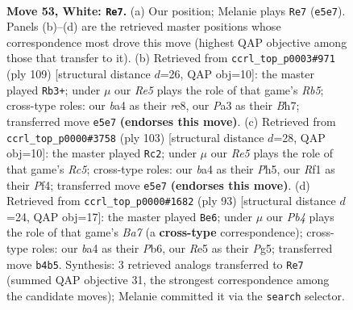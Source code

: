 \documentclass[11pt]{article}
\begin{document}
\clearpage

\begin{figure}[p]\centering
\begin{subfigure}{0.46\textwidth}\centering
\resizebox{\linewidth}{!}{%
\newchessgame
\chessboard[
  setfen={1r6/8/pp5k/4R3/bP1r4/P4B1K/8/5R2 w - - 8 53},
  showmover=false,
  pgfstyle=straightmove, color=movearrow, markmove={e5-e7}
]}
\caption{}
\end{subfigure}\hfill
\begin{subfigure}{0.46\textwidth}\centering
\resizebox{\linewidth}{!}{%
\newchessgame
\chessboard[
  setfen={4R3/5p1b/3k4/3P2pB/1r6/4K2P/6P1/8 b - - 20 55},
  showmover=false,
  pgfstyle=straightmove, color=movearrow, markmove={b4-b3}
]}
\caption{}
\end{subfigure}
\\[4pt]
\begin{subfigure}{0.46\textwidth}\centering
\resizebox{\linewidth}{!}{%
\newchessgame
\chessboard[
  setfen={3K4/5k2/3P4/7p/2r2p1P/5P2/1p6/1R6 b - - 3 52},
  showmover=false,
  pgfstyle=straightmove, color=movearrow, markmove={c4-c2}
]}
\caption{}
\end{subfigure}\hfill
\begin{subfigure}{0.46\textwidth}\centering
\resizebox{\linewidth}{!}{%
\newchessgame
\chessboard[
  setfen={8/R7/1p3k2/1B4p1/1P6/2P4P/b2r4/6K1 b - - 0 47},
  showmover=false,
  pgfstyle=straightmove, color=movearrow, markmove={a2-e6}
]}
\caption{}
\end{subfigure}
\caption{\textbf{Move 53, White: \texttt{Re7}.} (a) Our position; Melanie plays \texttt{Re7} (\texttt{e5e7}). Panels (b)--(d) are the retrieved master positions whose correspondence most drove this move (highest QAP objective among those that transfer to it). (b) Retrieved from \texttt{ccrl\_top\_p0003\#971} (ply 109) [structural distance $d$=26, QAP obj=10]: the master played \texttt{Rb3+}; under $\mu$ our \emph{Re5} plays the role of that game's \emph{Rb5}; cross-type roles: our \emph{b}a4 as their \emph{r}e8, our \emph{P}a3 as their \emph{B}h7; transferred move \texttt{e5e7} \textbf{(endorses this move)}. (c) Retrieved from \texttt{ccrl\_top\_p0000\#3758} (ply 103) [structural distance $d$=28, QAP obj=10]: the master played \texttt{Rc2}; under $\mu$ our \emph{Re5} plays the role of that game's \emph{Rc5}; cross-type roles: our \emph{b}a4 as their \emph{P}h5, our \emph{R}f1 as their \emph{P}f4; transferred move \texttt{e5e7} \textbf{(endorses this move)}. (d) Retrieved from \texttt{ccrl\_top\_p0000\#1682} (ply 93) [structural distance $d$=24, QAP obj=17]: the master played \texttt{Be6}; under $\mu$ our \emph{Pb4} plays the role of that game's \emph{Ba7} (a \textbf{cross-type} correspondence); cross-type roles: our \emph{b}a4 as their \emph{P}b6, our \emph{R}e5 as their \emph{P}g5; transferred move \texttt{b4b5}. Synthesis: 3 retrieved analogs transferred to \texttt{Re7} (summed QAP objective 31, the strongest correspondence among the candidate moves); Melanie committed it via the \texttt{search} selector.}
\label{fig:thought-m104}
\end{figure}
\end{document}
